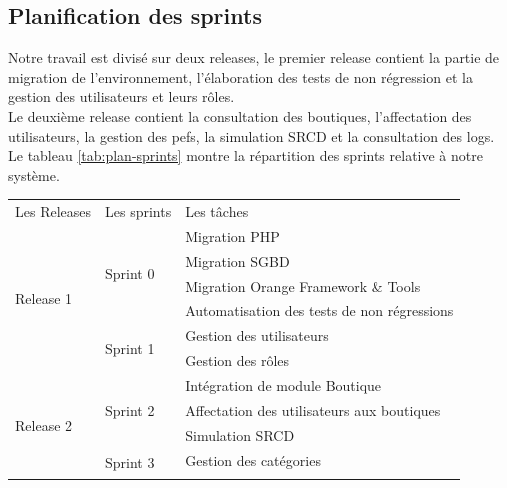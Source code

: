 \subsection[Planification des sprints]{Planification des sprints}
Notre travail est divisé sur deux releases, le premier release contient la partie de migration de l’environnement, l’élaboration des tests de non régression et la gestion des utilisateurs et leurs rôles.\\
Le deuxième release contient la consultation des boutiques, l’affectation des utilisateurs, la gestion des pefs, la simulation SRCD et la consultation des logs.\\
\newpage
Le tableau \ref{tab:plan-sprints} montre la répartition des sprints relative à notre système.
\begin{table}[H]
	\centering
	\begin{tabular}{|l|l|l|}
		\hline
		\rowcolor[HTML]{9B9B9B} 
		\multicolumn{3}{|c|}{Répartition des sprints}                                           \\ \hline
		\rowcolor[HTML]{C0C0C0} 
		Les Releases & Les sprints               & Les tâches                                   \\ \hline
		\multirow{6}{*}{Release 1} & \multirow{4}{*}{Sprint 0} & Migration PHP                  \\ \cline{3-3} 
		&                           & Migration SGBD                               \\ \cline{3-3} 
		&                           & Migration Orange Framework \& Tools          \\ \cline{3-3} 
		&                           & Automatisation des tests de non régressions  \\ \cline{2-3} 
		& \multirow{2}{*}{Sprint 1} & Gestion des utilisateurs                     \\ \cline{3-3} 
		&                           & Gestion des rôles                            \\ \hline
		\multirow{9}{*}{Release 2} & \multirow{3}{*}{Sprint 2} & Intégration de module Boutique \\ \cline{3-3} 
		&                           & Affectation des utilisateurs aux boutiques   \\ \cline{3-3} 
		&                           & Simulation SRCD                              \\ \cline{2-3} 
		& \multirow{6}{*}{Sprint 3} & Gestion des catégories                       \\ \cline{3-3} 

\end{tabular}
\end{table}
